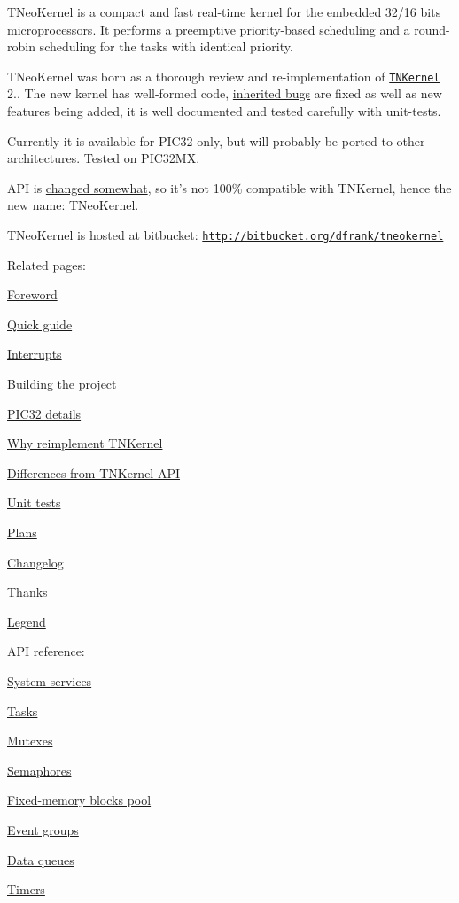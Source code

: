 T\+Neo\+Kernel is a compact and fast real-\/time kernel for the embedded 32/16 bits microprocessors. It performs a preemptive priority-\/based scheduling and a round-\/robin scheduling for the tasks with identical priority.

T\+Neo\+Kernel was born as a thorough review and re-\/implementation of \href{http://tnkernel.com}{\tt T\+N\+Kernel} 2.. The new kernel has well-\/formed code, \hyperlink{why_reimplement_why_reimplement__bugs}{inherited bugs} are fixed as well as new features being added, it is well documented and tested carefully with unit-\/tests.

Currently it is available for P\+I\+C32 only, but will probably be ported to other architectures. Tested on P\+I\+C32\+M\+X.

A\+P\+I is \hyperlink{tnkernel_diff}{changed somewhat}, so it's not 100\% compatible with T\+N\+Kernel, hence the new name\+: T\+Neo\+Kernel.

T\+Neo\+Kernel is hosted at bitbucket\+: \href{http://bitbucket.org/dfrank/tneokernel}{\tt http\+://bitbucket.\+org/dfrank/tneokernel}

Related pages\+:


\begin{DoxyItemize}
\item \hyperlink{foreword}{Foreword}
\item \hyperlink{quick_guide}{Quick guide}
\item \hyperlink{interrupts}{Interrupts}
\item \hyperlink{building}{Building the project}
\item \hyperlink{pic32_details}{P\+I\+C32 details}
\item \hyperlink{why_reimplement}{Why reimplement T\+N\+Kernel}
\item \hyperlink{tnkernel_diff}{Differences from T\+N\+Kernel A\+P\+I}
\item \hyperlink{unit_tests}{Unit tests}
\item \hyperlink{plans}{Plans}
\item \hyperlink{changelog}{Changelog}
\item \hyperlink{thanks}{Thanks}
\item \hyperlink{legend}{Legend}
\end{DoxyItemize}

A\+P\+I reference\+:


\begin{DoxyItemize}
\item \hyperlink{tn__sys_8h}{System services}
\item \hyperlink{tn__tasks_8h}{Tasks}
\item \hyperlink{tn__mutex_8h}{Mutexes}
\item \hyperlink{tn__sem_8h}{Semaphores}
\item \hyperlink{tn__fmem_8h}{Fixed-\/memory blocks pool}
\item \hyperlink{tn__eventgrp_8h}{Event groups}
\item \hyperlink{tn__dqueue_8h}{Data queues}
\item \hyperlink{tn__timer_8h}{Timers} 
\end{DoxyItemize}